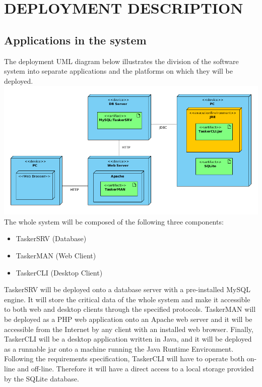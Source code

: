\documentclass{project}
\begin{document}
\section{DEPLOYMENT DESCRIPTION}
\subsection{Applications in the system}
The deployment UML diagram below illustrates the division of the software 
system into separate applications and the platforms on which they will be
deployed. \\
\includegraphics[width=\textwidth]{images/4.1/DeploymentDiagram} \\
The whole system will be composed of the following three components:
\begin{itemize}
	\item TaskerSRV (Database)
	\item TaskerMAN (Web Client)
	\item TaskerCLI (Desktop Client)
\end{itemize} 
TaskerSRV will be deployed onto a database server with a pre-installed MySQL
engine. It will store the critical data of the whole system and make it
accessible to both web and desktop clients through the specified protocols.
TaskerMAN will be deployed as a PHP web application onto an Apache web server
and it will be accessible from the Internet by any client with an installed web 
browser. Finally, TaskerCLI will be a desktop application written in Java, and it
will be deployed as a runnable jar onto a machine running the Java Runtime
Environment. Following the requirements specification\cite{se.qa.rs fr8 local storage}, TaskerCLI will have to
operate both on-line and off-line. Therefore it will have a direct access to 
a local storage provided by the SQLite database.
\end{document}
